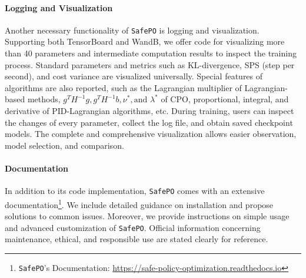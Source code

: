 \documentclass{article}
\begin{document}
\paragraph{Logging and Visualization} 
Another necessary functionality of \texttt{SafePO} is logging and visualization. Supporting both TensorBoard and WandB, we offer code for visualizing more than 40 parameters and intermediate computation results to inspect the training process. Standard parameters and metrics such as KL-divergence, SPS (step per second), and cost variance are visualized universally. Special features of algorithms are also reported, such as the Lagrangian multiplier of Lagrangian-based methods, $g^T H^{-1}g, g^T H^{-1}b, \nu^*, \textrm{and } \lambda^*$ of CPO, proportional, integral, and derivative of PID-Lagrangian algorithms, etc. During training, users can inspect the changes of every parameter, collect the log file, and obtain saved checkpoint models. The complete and comprehensive visualization allows easier observation, model selection, and comparison.

\paragraph{Documentation} 
In addition to its code implementation, \texttt{SafePO} comes with an extensive documentation\footnote{\texttt{SafePO}'s Documentation: \url{https://safe-policy-optimization.readthedocs.io}}. We include detailed guidance on installation and propose solutions to common issues. Moreover, we provide instructions on simple usage and advanced customization of \texttt{SafePO}. Official information concerning maintenance, ethical, and responsible use are stated clearly for reference.
\end{document}
